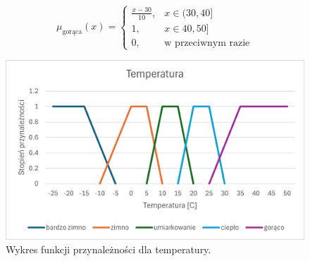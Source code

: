 \documentclass{article}
\begin{document}
\begin{enumerate}
                \begin{equation}
                    \mu_{\text{gorąca}}(x) =
                    \begin{cases}
                    \frac{x - 30}{10}, & x \in (30, 40] \\
                    1, & x \in 40, 50] \\
                    0, & \text{w przeciwnym razie}
                    \end{cases}
                \end{equation}

        \begin{figure}[H]
    \centering
    \includegraphics[width=\textwidth]{img/temp.png}
    \caption{Wykres funkcji przynależności dla temperatury.}
    \end{figure}


\end{enumerate}
\end{document}
